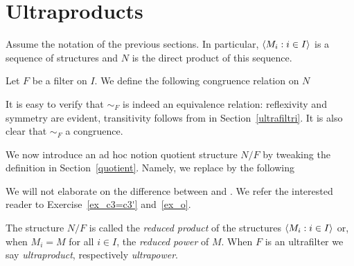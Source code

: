 \documentclass[creche.tex]{subfiles}
\begin{document}
% 
% 
% 





\section{Ultraproducts}
Assume the notation of the previous sections. In particular, $\langle M_i:i\in I\rangle$ is a sequence of structures and $N$ is the direct product of this sequence. 

Let $F$ be a filter on $I$. We define the following congruence relation on $N$


It is easy to verify that $\sim_F$ is indeed an equivalence relation: reflexivity and symmetry are evident, transitivity follows from  in Section~\ref{ultrafiltri}. It is also clear that $\sim_F$ a congruence. 

We now introduce an ad hoc notion quotient structure \emph{$N/F$\/} by tweaking the definition in Section~\ref{quotient}.  Namely, we replace   by the following


We will not elaborate on the difference between  and . We refer the interested reader to Exercise~\ref{ex_c3=c3'} and~\ref{ex_o}.

The structure $N/F$ is called the \emph{reduced product\/} of the structures $\langle M_i:i\in I\rangle$ or, when $M_i=M$ for all $i\in I$, the \emph{reduced power\/} of $M$. When $F$ is an ultrafilter we say \emph{ultraproduct}, respectively \emph{ultrapower}. 
\end{document}
